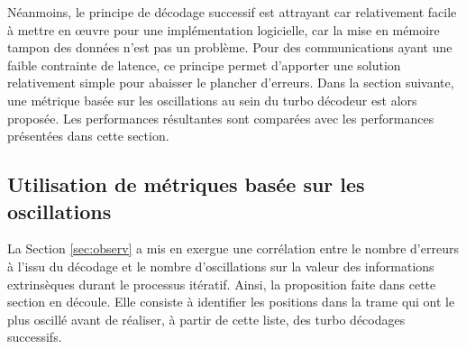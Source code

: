 Néanmoins, le principe de décodage successif est attrayant car relativement facile à mettre en œuvre pour une 
implémentation logicielle, car la mise en mémoire tampon des données n'est pas un problème.
Pour des communications ayant une faible contrainte de latence, ce principe permet d'apporter une solution relativement
simple pour abaisser le plancher d'erreurs. 
Dans la section suivante, une métrique basée sur les oscillations au sein du turbo décodeur est alors proposée. Les performances
résultantes sont comparées avec les performances présentées dans cette section.

\subsection{Utilisation de métriques basée sur les oscillations}
La Section \ref{sec:observ} a mis en exergue une corrélation entre le nombre d'erreurs à l'issu du décodage et 
le nombre d'oscillations sur la valeur des informations extrinsèques durant le processus itératif. Ainsi, la proposition faite dans cette section en découle. Elle 
consiste à identifier les positions dans la trame qui ont le plus oscillé avant de réaliser, à partir de cette liste, des turbo décodages successifs.

